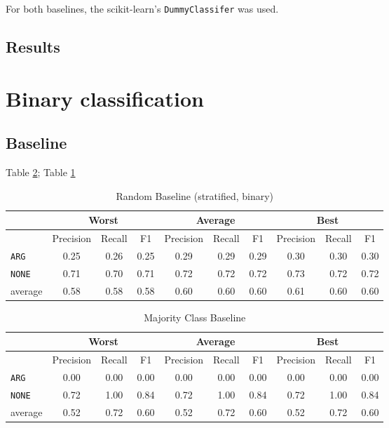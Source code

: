 For both baselines, the scikit-learn's \texttt{DummyClassifer} was used.
\subsection{Results}

\section{Binary classification}
\subsection{Baseline}

Table \ref{tbl:bin_maj}; Table \ref{tbl:bin_strat}

 \begin{table}[h]
                \centering
\caption{Random Baseline (stratified, binary)}
\label{tbl:bin_strat}
 \begin{tabular}{@{}lccccccccc@{}}
              \toprule
               & \multicolumn{3}{c}{Worst} & \multicolumn{3}{c}{Average} & \multicolumn{3}{c}{Best}  \\ \midrule
               & Precision  & Recall & F1   & Precision  & Recall  & F1    & Precision & Recall & F1   \\ \toprule
\texttt{ARG}	 & 0.25	 & 0.26	 & 0.25	 &0.29	 & 0.29	 & 0.29	 &0.30	 & 0.30	 & 0.30	 \\ 
\texttt{NONE}	 & 0.71	 & 0.70	 & 0.71	 &0.72	 & 0.72	 & 0.72	 &0.73	 & 0.72	 & 0.72	 \\ \midrule 
average	 & 0.58	 & 0.58	 & 0.58	 &0.60	 & 0.60	 & 0.60	 &0.61	 & 0.60	 & 0.60	 \\ \bottomrule

    \end{tabular}
\end{table}

 \begin{table}[h]
                \centering
\caption{Majority Class Baseline}
\label{tbl:bin_maj}
 \begin{tabular}{@{}lccccccccc@{}}
              \toprule
               & \multicolumn{3}{c}{Worst} & \multicolumn{3}{c}{Average} & \multicolumn{3}{c}{Best}  \\ \midrule
               & Precision  & Recall & F1   & Precision  & Recall  & F1    & Precision & Recall & F1   \\ \toprule
\texttt{ARG}	 & 0.00	 & 0.00	 & 0.00	 &0.00	 & 0.00	 & 0.00	 &0.00	 & 0.00	 & 0.00	 \\ 
\texttt{NONE}	 & 0.72	 & 1.00	 & 0.84	 &0.72	 & 1.00	 & 0.84	 &0.72	 & 1.00	 & 0.84	 \\ \midrule 
average	 & 0.52	 & 0.72	 & 0.60	 &0.52	 & 0.72	 & 0.60	 &0.52	 & 0.72	 & 0.60	 \\ \bottomrule

    \end{tabular}
\end{table}

